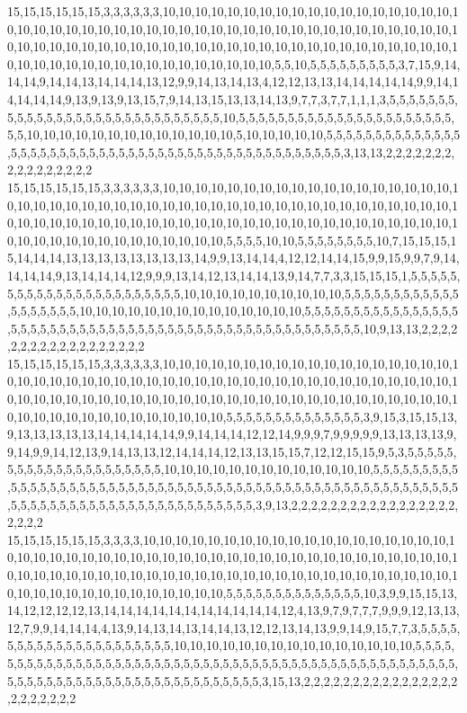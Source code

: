 15,15,15,15,15,15,3,3,3,3,3,3,10,10,10,10,10,10,10,10,10,10,10,10,10,10,10,10,10,10,10,10,10,10,10,10,10,10,10,10,10,10,10,10,10,10,10,10,10,10,10,10,10,10,10,10,10,10,10,10,10,10,10,10,10,10,10,10,10,10,10,10,10,10,10,10,10,10,10,10,10,10,10,10,10,10,10,10,10,10,10,10,10,10,10,10,10,10,10,10,10,10,10,5,5,10,5,5,5,5,5,5,5,5,5,3,7,15,9,14,14,14,9,14,14,13,14,14,14,13,12,9,9,14,13,14,13,4,12,12,13,13,14,14,14,14,14,9,9,14,14,14,14,14,9,13,9,13,9,13,15,7,9,14,13,15,13,13,14,13,9,7,7,3,7,7,1,1,1,3,5,5,5,5,5,5,5,5,5,5,5,5,5,5,5,5,5,5,5,5,5,5,5,5,5,5,5,5,5,10,5,5,5,5,5,5,5,5,5,5,5,5,5,5,5,5,5,5,5,5,5,5,5,5,10,10,10,10,10,10,10,10,10,10,10,10,10,5,10,10,10,10,10,5,5,5,5,5,5,5,5,5,5,5,5,5,5,5,5,5,5,5,5,5,5,5,5,5,5,5,5,5,5,5,5,5,5,5,5,5,5,5,5,5,5,5,5,5,5,5,5,3,13,13,2,2,2,2,2,2,2,2,2,2,2,2,2,2,2,2
15,15,15,15,15,15,3,3,3,3,3,3,10,10,10,10,10,10,10,10,10,10,10,10,10,10,10,10,10,10,10,10,10,10,10,10,10,10,10,10,10,10,10,10,10,10,10,10,10,10,10,10,10,10,10,10,10,10,10,10,10,10,10,10,10,10,10,10,10,10,10,10,10,10,10,10,10,10,10,10,10,10,10,10,10,10,10,10,10,10,10,10,10,10,10,10,10,10,10,10,5,5,5,5,10,10,5,5,5,5,5,5,5,5,10,7,15,15,15,15,14,14,14,13,13,13,13,13,13,13,13,14,9,9,13,14,14,4,12,12,14,14,15,9,9,15,9,9,7,9,14,14,14,14,9,13,14,14,14,12,9,9,9,13,14,12,13,14,14,13,9,14,7,7,3,3,15,15,15,1,5,5,5,5,5,5,5,5,5,5,5,5,5,5,5,5,5,5,5,5,5,5,5,10,10,10,10,10,10,10,10,10,10,5,5,5,5,5,5,5,5,5,5,5,5,5,5,5,5,5,5,5,10,10,10,10,10,10,10,10,10,10,10,10,10,10,5,5,5,5,5,5,5,5,5,5,5,5,5,5,5,5,5,5,5,5,5,5,5,5,5,5,5,5,5,5,5,5,5,5,5,5,5,5,5,5,5,5,5,5,5,5,5,5,5,5,5,5,10,9,13,13,2,2,2,2,2,2,2,2,2,2,2,2,2,2,2,2,2,2
15,15,15,15,15,15,3,3,3,3,3,3,10,10,10,10,10,10,10,10,10,10,10,10,10,10,10,10,10,10,10,10,10,10,10,10,10,10,10,10,10,10,10,10,10,10,10,10,10,10,10,10,10,10,10,10,10,10,10,10,10,10,10,10,10,10,10,10,10,10,10,10,10,10,10,10,10,10,10,10,10,10,10,10,10,10,10,10,10,10,10,10,10,10,10,10,10,10,10,10,5,5,5,5,5,5,5,5,5,5,5,5,5,5,3,9,15,3,15,15,13,9,13,13,13,13,13,14,14,14,14,14,9,9,14,14,14,12,12,14,9,9,9,7,9,9,9,9,9,13,13,13,13,9,9,14,9,9,14,12,13,9,14,13,13,12,14,14,14,12,13,13,15,15,7,12,12,15,15,9,5,3,5,5,5,5,5,5,5,5,5,5,5,5,5,5,5,5,5,5,5,5,5,10,10,10,10,10,10,10,10,10,10,10,10,10,5,5,5,5,5,5,5,5,5,5,5,5,5,5,5,5,5,5,5,5,5,5,5,5,5,5,5,5,5,5,5,5,5,5,5,5,5,5,5,5,5,5,5,5,5,5,5,5,5,5,5,5,5,5,5,5,5,5,5,5,5,5,5,5,5,5,5,5,5,5,5,5,5,5,5,5,5,5,5,5,3,9,13,2,2,2,2,2,2,2,2,2,2,2,2,2,2,2,2,2,2,2,2,2
15,15,15,15,15,15,3,3,3,3,10,10,10,10,10,10,10,10,10,10,10,10,10,10,10,10,10,10,10,10,10,10,10,10,10,10,10,10,10,10,10,10,10,10,10,10,10,10,10,10,10,10,10,10,10,10,10,10,10,10,10,10,10,10,10,10,10,10,10,10,10,10,10,10,10,10,10,10,10,10,10,10,10,10,10,10,10,10,10,10,10,10,10,10,10,10,10,10,10,5,5,5,5,5,5,5,5,5,5,5,5,5,5,10,3,9,9,15,15,13,14,12,12,12,12,13,14,14,14,14,14,14,14,14,14,14,14,12,4,13,9,7,9,7,7,7,9,9,9,12,13,13,12,7,9,9,14,14,14,4,13,9,14,13,14,13,14,14,13,12,12,13,14,13,9,9,14,9,15,7,7,3,5,5,5,5,5,5,5,5,5,5,5,5,5,5,5,5,5,5,5,5,5,10,10,10,10,10,10,10,10,10,10,10,10,10,10,10,5,5,5,5,5,5,5,5,5,5,5,5,5,5,5,5,5,5,5,5,5,5,5,5,5,5,5,5,5,5,5,5,5,5,5,5,5,5,5,5,5,5,5,5,5,5,5,5,5,5,5,5,5,5,5,5,5,5,5,5,5,5,5,5,5,5,5,5,5,5,5,5,5,5,5,5,3,15,13,2,2,2,2,2,2,2,2,2,2,2,2,2,2,2,2,2,2,2,2,2,2,2
